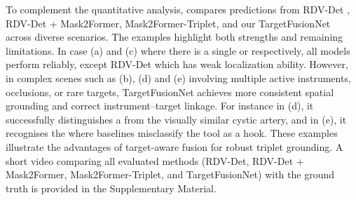 \label{sec:qualitative}
To complement the quantitative analysis,  compares predictions from RDV-Det \cite{NWOYE2022102433_rendevous}, RDV-Det + Mask2Former, Mask2Former-Triplet, and our TargetFusionNet across diverse scenarios. The examples highlight both strengths and remaining limitations. In case (a) and (c) where there is  a single  or  respectively, all models perform reliably, except RDV-Det which has weak localization ability. However, in complex scenes such as (b), (d) and (e) involving multiple active instruments, occlusions, or rare targets, TargetFusionNet achieves more consistent spatial grounding and correct instrument–target linkage. For instance in (d), it successfully distinguishes a  from the visually similar cystic artery, and in (e), it recognises the   where baselines misclassify the tool as a hook. These examples illustrate the advantages of target-aware fusion for robust triplet grounding.
A short video comparing all evaluated methods (RDV-Det, RDV-Det + Mask2Former, Mask2Former-Triplet, and TargetFusionNet) with the ground truth is provided in the Supplementary Material.






